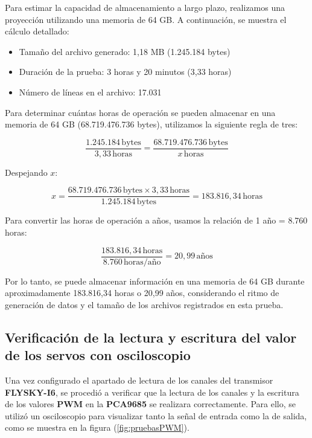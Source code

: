 Para estimar la capacidad de almacenamiento a largo plazo, realizamos una proyección utilizando una memoria de 64 GB. A continuación, se muestra el cálculo detallado:

\vspace{5 px}
\begin{itemize}
    \item Tamaño del archivo generado: 1,18 MB (1.245.184 bytes)
    \item Duración de la prueba: 3 horas y 20 minutos (3,33 horas)
    \item Número de líneas en el archivo: 17.031
\end{itemize}
\vspace{5 px}
Para determinar cuántas horas de operación se pueden almacenar en una memoria de 64 GB (68.719.476.736 bytes), utilizamos la siguiente regla de tres:

\begin{equation}
\frac{1.245.184 \, \text{bytes}}{3,33 \, \text{horas}} = \frac{68.719.476.736 \, \text{bytes}}{x \, \text{horas}}
\end{equation}

Despejando \( x \):

\begin{equation}
x = \frac{68.719.476.736 \, \text{bytes} \times 3,33 \, \text{horas}}{1.245.184 \, \text{bytes}} = 183.816,34 \, \text{horas}
\end{equation}

Para convertir las horas de operación a años, usamos la relación de 1 año = 8.760 horas:

\begin{equation}
\frac{183.816,34 \, \text{horas}}{8.760 \, \text{horas/año}} = 20,99 \, \text{años}
\end{equation}

\vspace{5 px}
Por lo tanto, se puede almacenar información en una memoria de 64 GB durante aproximadamente 183.816,34 horas o 20,99 años, considerando el ritmo de generación de datos y el tamaño de los archivos registrados en esta prueba.


\subsection{Verificación de la lectura y escritura del valor de los servos con osciloscopio}

Una vez configurado el apartado de lectura de los canales del transmisor \textbf{FLYSKY-I6}, se procedió a verificar que la lectura de los canales y la escritura de los valores \textbf{PWM} en la \textbf{PCA9685} se realizara correctamente. Para ello, se utilizó un osciloscopio para visualizar tanto la señal de entrada como la de salida, como se muestra en la figura (\ref{fig:pruebasPWM}).


